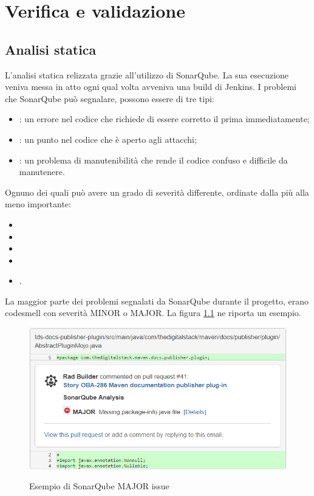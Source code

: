 
\chapter{Verifica e validazione}
\label{cap:testing} 

\section{Analisi statica}
L'analisi statica relizzata grazie all'utilizzo di SonarQube.
La sua esecuzione veniva messa in atto ogni qual volta avveniva una build di Jenkins.
I problemi che SonarQube può segnalare, possono essere di tre tipi:
\begin{itemize}
    \item {}: un errore nel codice che richiede di essere corretto il prima immediatamente;
    \item {}: un punto nel codice che è aperto agli attacchi;
    \item {}:  un problema di manutenibilità che rende il codice confuso e difficile da manutenere.
\end{itemize}
Ognuno dei quali può avere un grado di severità differente, ordinate dalla più alla meno importante:
\begin{itemize}
    \item {}
    \item {}
    \item {}
    \item {}
    \item {}.
\end{itemize}

La maggior parte dei problemi segnalati da SonarQube durante il progetto, erano codesmell con severità MINOR o MAJOR.
La figura \ref{sonarMAJORissue} ne riporta un esempio.

\clearpage

\begin{figure}[H]
    \centering
    \includegraphics[width=\textwidth]{immagini/major-issue.png}\\
    \caption{Esempio di SonarQube MAJOR issue}
    \label{sonarMAJORissue}
\end{figure}

